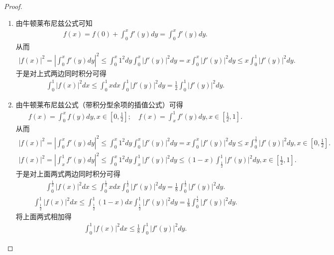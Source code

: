 \documentclass[../../main.tex]{subfiles}
\begin{document}
\begin{proof}
\begin{enumerate}
\item 由牛顿莱布尼兹公式可知
\begin{align*}
f(x) = f(0) + \int_{0}^{x}f'(y)dy=\int_{0}^{x}f'(y)dy.
\end{align*}
从而
\begin{align*}
|f(x)|^2 = \left| \int_{0}^{x}f'(y)dy \right|^2 \leqslant \int_{0}^{x}1^2dy \int_{0}^{x}|f'(y)|^2dy = x\int_{0}^{x}|f'(y)|^2dy \leqslant x\int_{0}^{1}|f'(y)|^2dy.
\end{align*}
于是对上式两边同时积分可得
\begin{align*}
\int_{0}^{1}|f(x)|^2dx \leqslant \int_{0}^{1}xdx \int_{0}^{1}|f'(y)|^2dy = \frac{1}{2}\int_{0}^{1}|f'(y)|^2dy.
\end{align*}

\item 由牛顿莱布尼兹公式（带积分型余项的插值公式）可得
\begin{align*}
f(x) = \int_{0}^{x}f(y)dy, x \in \left[0, \frac{1}{2}\right]; \quad f(x) = \int_{x}^{1}f'(y)dy, x \in \left[\frac{1}{2}, 1\right].
\end{align*}
从而
\begin{align*}
|f(x)|^2 = \left| \int_{0}^{x}f'(y)dy \right|^2 \leqslant \int_{0}^{x}1^2dy\int_{0}^{x}|f'(y)|^2dy = x\int_{0}^{x}|f'(y)|^2dy \leqslant x\int_{0}^{\frac{1}{2}}|f'(y)|^2dy, x \in \left[0, \frac{1}{2}\right].
\end{align*}
\begin{align*}
|f(x)|^2 = \left| \int_{x}^{1}f'(y)dy \right|^2 \leqslant \int_{0}^{x}1^2dy\int_{x}^{1}|f'(y)|^2dy \leqslant (1 - x)\int_{\frac{1}{2}}^{1}|f'(y)|^2dy, x \in \left[\frac{1}{2}, 1\right].
\end{align*}
于是对上面两式两边同时积分可得
\begin{align*}
\int_{0}^{\frac{1}{2}}|f(x)|^2dx \leqslant \int_{0}^{\frac{1}{2}}xdx\int_{0}^{\frac{1}{2}}|f'(y)|^2dy = \frac{1}{8}\int_{0}^{\frac{1}{2}}|f'(y)|^2dy.
\end{align*}
\begin{align*}
\int_{\frac{1}{2}}^{1}|f(x)|^2dx \leqslant \int_{\frac{1}{2}}^{1}(1 - x)dx\int_{\frac{1}{2}}^{1}|f'(y)|^2dy = \frac{1}{8}\int_{0}^{\frac{1}{2}}|f'(y)|^2dy.
\end{align*}
将上面两式相加得
\begin{align*}
\int_{0}^{1}|f(x)|^2dx \leqslant \frac{1}{8}\int_{0}^{1}|f'(y)|^2dy.
\end{align*}
\end{enumerate}
\end{proof}
\end{document}
